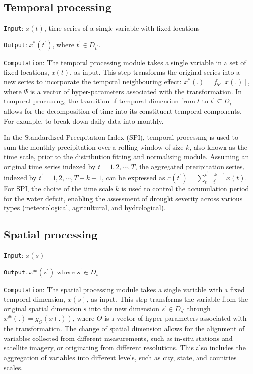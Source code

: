 \documentclass[
]{interact}
\begin{document}
\hypertarget{temporal-processing}{%
\subsection{Temporal processing}\label{temporal-processing}}

\texttt{Input}: \(x(t)\), time series of a single variable with fixed
locations

\texttt{Output}: \(x^*(t^{\prime})\), where
\(t^\prime \in D_{t^{\prime}}\).

\texttt{Computation}: The temporal processing module takes a single
variable in a set of fixed locations, \(x(t)\), as input. This step
transforms the original series into a new series to incorporate the
temporal neighbouring effect: \(x^*(.) = f_{\Psi}[x(.)]\), where
\(\Psi\) is a vector of hyper-parameters associated with the
transformation. In temporal processing, the transition of temporal
dimension from \(t\) to \(t^\prime \subseteq D_{t^\prime}\) allows for
the decomposition of time into its constituent temporal components. For
example, to break down daily data into monthly.

In the Standardized Precipitation Index (SPI), temporal processing is
used to sum the monthly precipitation over a rolling window of size
\(k\), also known as the time scale, prior to the distribution fitting
and normalising module. Assuming an original time series indexed by
\(t= 1, 2, \cdots, T\), the aggregated precipitation series, indexed by
\(t^\prime = 1, 2, \cdots, T-k+1\), can be expressed as
\(x(t^\prime) = \sum_{t = t^\prime}^{t^\prime + k -1}x(t)\). For SPI,
the choice of the time scale \(k\) is used to control the accumulation
period for the water deficit, enabling the assessment of drought
severity across various types (meteorological, agricultural, and
hydrological).

\hypertarget{spatial-processing}{%
\subsection{Spatial processing}\label{spatial-processing}}

\texttt{Input}: \(x(s)\)

\texttt{Output}: \(x^\#(s^\prime)\) where
\(s^\prime \in D_{s^{\prime}}\)

\texttt{Computation}: The spatial processing module takes a single
variable with a fixed temporal dimension, \(x(s)\), as input. This step
transforms the variable from the original spatial dimension \(s\) into
the new dimension \(s^\prime \in D_{s^\prime}\) through
\(x^\#(.) = g_{\Theta}(x(.))\), where \(\Theta\) is a vector of
hyper-parameters associated with the transformation. The change of
spatial dimension allows for the alignment of variables collected from
different measurements, such as in-situ stations and satellite imagery,
or originating from different resolutions. This also includes the
aggregation of variables into different levels, such as city, state, and
countries scales.
\end{document}
